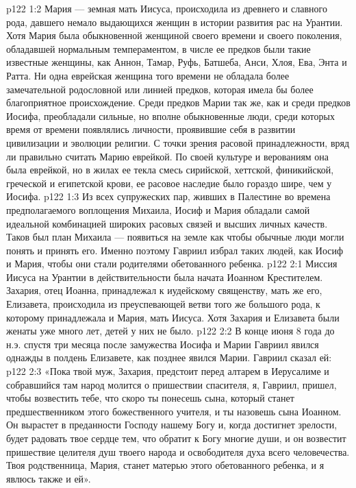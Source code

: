 \vs p122 1:2 Мария --- земная мать Иисуса, происходила из древнего и славного рода, давшего немало выдающихся женщин в истории развития рас на Урантии. Хотя Мария была обыкновенной женщиной своего времени и своего поколения, обладавшей нормальным темпераментом, в числе ее предков были такие известные женщины, как Аннон, Тамар, Руфь, Батшеба, Анси, Хлоя, Ева, Энта и Ратта. Ни одна еврейская женщина того времени не обладала более замечательной родословной или линией предков, которая имела бы более благоприятное происхождение. Среди предков Марии так же, как и среди предков Иосифа, преобладали сильные, но вполне обыкновенные люди, среди которых время от времени появлялись личности, проявившие себя в развитии цивилизации и эволюции религии. С точки зрения расовой принадлежности, вряд ли правильно считать Марию еврейкой. По своей культуре и верованиям она была еврейкой, но в жилах ее текла смесь сирийской, хеттской, финикийской, греческой и египетской крови, ее расовое наследие было гораздо шире, чем у Иосифа.
\vs p122 1:3 Из всех супружеских пар, живших в Палестине во времена предполагаемого воплощения Михаила, Иосиф и Мария обладали самой идеальной комбинацией широких расовых связей и высших личных качеств. Таков был план Михаила --- появиться на земле как  чтобы обычные люди могли понять и принять его. Именно поэтому Гавриил избрал таких людей, как Иосиф и Мария, чтобы они стали родителями обетованного ребенка.
\vs p122 2:1 Миссия Иисуса на Урантии в действительности была начата Иоанном Крестителем. Захария, отец Иоанна, принадлежал к иудейскому священству, мать же его, Елизавета, происходила из преуспевающей ветви того же большого рода, к которому принадлежала и Мария, мать Иисуса. Хотя Захария и Елизавета были женаты уже много лет, детей у них не было.
\vs p122 2:2 \pc В конце июня 8 года до н.э. спустя три месяца после замужества Иосифа и Марии Гавриил явился однажды в полдень Елизавете, как позднее явился Марии. Гавриил сказал ей:
\vs p122 2:3 «Пока твой муж, Захария, предстоит перед алтарем в Иерусалиме и собравшийся там народ молится о пришествии спасителя, я, Гавриил, пришел, чтобы возвестить тебе, что скоро ты понесешь сына, который станет предшественником этого божественного учителя, и ты назовешь сына Иоанном. Он вырастет в преданности Господу нашему Богу и, когда достигнет зрелости, будет радовать твое сердце тем, что обратит к Богу многие души, и он возвестит пришествие целителя душ твоего народа и освободителя духа всего человечества. Твоя родственница, Мария, станет матерью этого обетованного ребенка, и я явлюсь также и ей».
